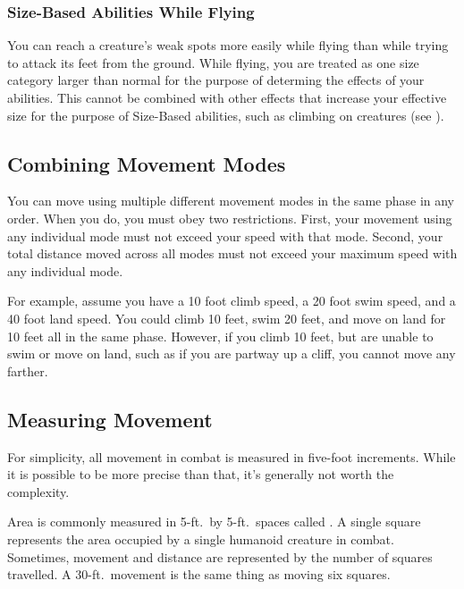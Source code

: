         \subsubsection{Size-Based Abilities While Flying}
            You can reach a creature's weak spots more easily while flying than while trying to attack its feet from the ground.
            While flying, you are treated as one size category larger than normal for the purpose of determing the effects of your  abilities.
            This cannot be combined with other effects that increase your effective size for the purpose of Size-Based abilities, such as climbing on creatures (see ).

    \subsection{Combining Movement Modes}
        You can move using multiple different movement modes in the same phase in any order.
        When you do, you must obey two restrictions.
        First, your movement using any individual mode must not exceed your speed with that mode.
        Second, your total distance moved across all modes must not exceed your maximum speed with any individual mode.

        For example, assume you have a 10 foot climb speed, a 20 foot swim speed, and a 40 foot land speed.
        You could climb 10 feet, swim 20 feet, and move on land for 10 feet all in the same phase.
        However, if you climb 10 feet, but are unable to swim or move on land, such as if you are partway up a cliff, you cannot move any farther.

    \subsection{Measuring Movement}

        For simplicity, all movement in combat is measured in five-foot increments.
        While it is possible to be more precise than that, it's generally not worth the complexity.

        \label{Squares} Area is commonly measured in 5-ft.\ by 5-ft.\ spaces called .
        A single square represents the area occupied by a single humanoid creature in combat.
        Sometimes, movement and distance are represented by the number of squares travelled.
        A 30-ft.\ movement is the same thing as moving six squares.

